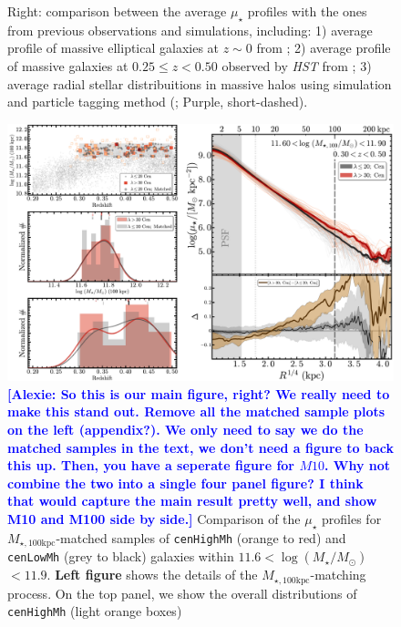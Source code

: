 \documentclass{emulateapj}
\def\rbcg{\texttt{cenHighMh}}
\def\nbcg{\texttt{cenLowMh}}
\def\logms{{$\log (M_{\star}/M_{\odot})$}}
\def\mtot{{$M_{\star,100\mathrm{kpc}}$}}
\def\mden{{$\mu_{\star}$}}
\newcommand{\alexie}[1]{\textcolor{blue}{\textbf{[Alexie: #1]}}}
\begin{document}
\begin{CJK*}{UTF8}{gbsn}
\begin{figure}[bt!]
{        Right: comparison between the average \mden{} profiles with the ones from 
        previous observations and simulations, including: 
        1) average profile of massive elliptical galaxies at $z\sim 0$ from 
        \citet[][Cyan, solid]{Huang2013a}; 
        2) average profile of massive galaxies at $0.25 \leq z < 0.50$ observed by 
        \textit{HST} from \citet[][Red, long-dashed]{Patel2013} ;
        3) average radial stellar distribuitions in massive halos using simulation and 
        particle tagging method (\citealt{Cooper13}; Purple, short-dashed).}
      \label{fig:avg_prof}
  \end{figure}

  \begin{figure}[t!]
      \centering 
      \includegraphics[width=\textwidth]{fig/redbcg_prof_m100A}
      \caption{\alexie{So this is our main figure, right? We really need to make this stand out. Remove all the matched sample plots on the left (appendix?). We only need to say we do the matched samples in the text, we don't need a figure to back this up. Then, you have a seperate figure for $M10$. Why not combine the two into a single four panel figure? I think that would capture the main result pretty well, and show M10 and M100 side by side.} Comparison of the \mden{} profiles for \mtot{}-matched samples of \rbcg{}
      (orange to red) and \nbcg{} (grey to black) galaxies within $11.6<$\logms{}$<11.9$.
      \textbf{Left figure} shows the details of the \mtot{}-matching process.  
      On the top panel, we show the overall distributions of \rbcg{} (light orange boxes) 
}
\end{figure}
\end{CJK*}
\end{document}
